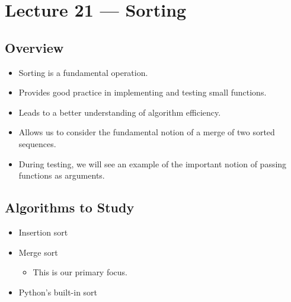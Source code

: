 \documentclass[letterpaper,10pt,english]{sphinxmanual}
\begin{document}
\chapter{Lecture 21 — Sorting}
\label{\detokenize{lecture_notes/lec21_sorting:lecture-21-sorting}}\label{\detokenize{lecture_notes/lec21_sorting::doc}}

\section{Overview}
\label{\detokenize{lecture_notes/lec21_sorting:overview}}\begin{itemize}
\item {} 
Sorting is a fundamental operation.

\item {} 
Provides good practice in implementing and testing small functions.

\item {} 
Leads to a better understanding of algorithm efficiency.

\item {} 
Allows us to consider the fundamental notion of a merge of two sorted
sequences.

\item {} 
During testing, we will see an example of the important notion of
passing functions as arguments.

\end{itemize}


\section{Algorithms to Study}
\label{\detokenize{lecture_notes/lec21_sorting:algorithms-to-study}}\begin{itemize}
\item {} 
Insertion sort

\item {} 
Merge sort
\begin{itemize}
\item {} 
This is our primary focus.

\end{itemize}

\item {} 
Python’s built-in sort

\end{itemize}
\end{document}
